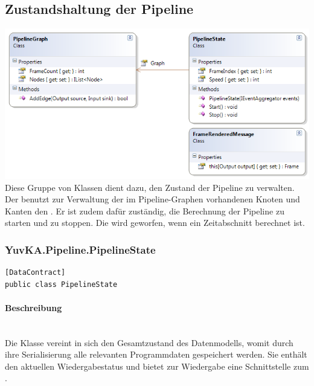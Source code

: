 \subsection{Zustandshaltung der Pipeline}

\includegraphics[width=\textwidth]{YuvKA.Pipeline/states.png}
Diese Gruppe von Klassen dient dazu, den Zustand der Pipeline zu verwalten. Der  benutzt zur Verwaltung der im Pipeline-Graphen vorhandenen Knoten und Kanten den . Er ist zudem dafür zuständig, die Berechnung der Pipeline zu starten und zu stoppen. Die  wird geworfen, wenn ein Zeitabschnitt berechnet ist.

\subsubsection{YuvKA.Pipeline.PipelineState}

\begin{verbatim}
[DataContract]
public class PipelineState
\end{verbatim}

\paragraph{Beschreibung}~\\
Die Klasse  vereint in sich den Gesamtzustand des Datenmodells, womit durch ihre Serialisierung alle relevanten Programmdaten gespeichert werden. Sie enthält den aktuellen Wiedergabestatus und bietet zur Wiedergabe eine Schnittstelle zum .

